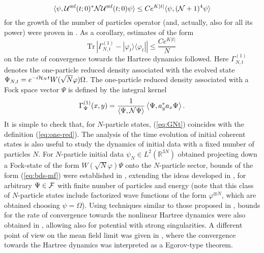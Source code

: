 \documentclass[11pt,a4paper]{article}
\newcommand{\cU}{{\cal U}}
\newcommand{\bR}{{\mathbb R}}
\newcommand{\tr}{\mbox{Tr}}
\newcommand{\cF}{{\cal F}}
\newcommand{\cH}{{\cal H}}
\newcommand{\cN}{{\cal N}}
\begin{document}
\[ \langle \psi , \cU^{\text{mf}} (t;0)^* \cN \cU^{\text{mf}} (t;0) \psi \rangle \leq C e^{K |t|} \langle \psi, (\cN+1)^{4} \psi \rangle \]
for the growth of the number of particles operator (and, actually, also for all its power) were proven in \cite{RS}. As a corollary, estimates of the form
\begin{equation}\label{eq:bds-mf} \tr \, \left| \Gamma_{N,t}^{(1)} - |\varphi_t \rangle \langle \varphi_t| \right| \leq \frac{C e^{K|t|}}{N} \,  \end{equation}
on the rate of convergence towards the Hartree dynamics followed. Here $\Gamma_{N,t}^{(1)}$ denotes the one-particle reduced density associated with the evolved state $\Psi_{N,t} = e^{-i\cH_N t} W(\sqrt{N} \varphi) \Omega$. The one-particle reduced density associated with a Fock space vector $\Psi$ is defined by the integral kernel
\begin{equation}\label{eq:GNt} \Gamma_{\Psi}^{(1)} (x,y) = \frac{1}{\langle
\Psi , \cN \Psi \rangle} \left\langle \Psi , a_y^* a_x \Psi \right\rangle. \end{equation}
It is simple to check that, for $N$-particle states, (\ref{eq:GNt}) coincides with the definition (\ref{eq:one-red}). 
The analysis of the time evolution of initial coherent states is also useful to study the dynamics of initial data with a fixed number of particles $N$. For $N$-particle initial data $\psi_N \in L^2 (\bR^{3N})$ obtained projecting down a Fock-state of the form $W(\sqrt{N} \varphi) \Psi$ onto the $N$-particle sector, bounds of the form (\ref{eq:bds-mf}) were established in \cite{CLS}, extending the ideas developed in \cite{RS}, for arbitrary $\Psi \in \cF$ with finite number of particles and energy (note that this class of $N$-particle states include factorized wave functions of the form $\varphi^{\otimes N}$, which are obtained choosing $\psi = \Omega$). Using techniques similar to those proposed in \cite{P}, bounds for the rate of convergence towards the nonlinear Hartree dynamics were also obtained in \cite{KP2009}, allowing also for potential with strong singularities. A different point of view on the mean field limit was given in \cite{FKS}, where the convergence towards the Hartree dynamics was 
interpreted as a Egorov-type theorem.

\bigskip
\end{document}
